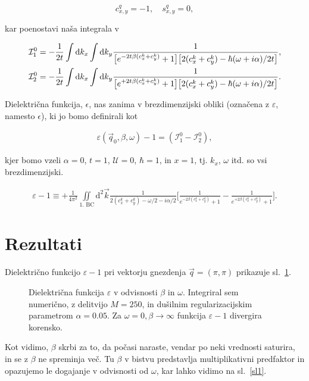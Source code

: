 \documentclass[a4paper, 12pt]{article}
\newcommand{\vq}{
	\ensuremath{\vec{q}}
}
\newcommand{\w}{
	\ensuremath{\omega}
}
\newcommand{\e}{
	\ensuremath{\epsilon}
}
\newcommand{\vk}{
	\ensuremath{\vec{k}}
}
\renewcommand{\ni}{
	\noindent
}
\newcommand{\dd}{
	\ensuremath{\text{d}}
}
\newcommand{\I}{
	\ensuremath{\mathcal{I}}
}
\begin{document}
\begin{equation}
	c_{x,y}^q = -1, \quad s_{x,y}^q = 0,
\end{equation}

\ni kar poenostavi na\v sa integrala v

\begin{align}
	\I_1^0 &= -\frac{1}{2t}\int \dd k_x\int \dd k_y \frac{1}
		{\big[e^{-2t\beta(c_x^k + c_y^k)} + 1\big]\big[2(c_x^k + c_y^k) -
		\hbar(\w + i\alpha)/2t\big]}, \notag \\
	\I_2^0 &= -\frac{1}{2t}\int \dd k_x\int \dd k_y \frac{1}
	{\big[e^{+2t\beta(c_x^k + c_y^k)} + 1\big]\big[2(c_x^k + c_y^k) - \hbar(\w + i\alpha)/2t\big]}.
\end{align}

Dielektri\v cna funkcija, $\e$, nas zanima v brezdimenzijski obliki (ozna\v cena z $\varepsilon$, namesto $\e$), ki jo bomo
definirali kot

\begin{align}
	\varepsilon (\vq_0, \beta, \w) -1 = (\I^0_1 - \I^0_2),
\end{align}

kjer bomo vzeli $\alpha = 0$, $t = 1$, $\mathcal{U} = 0$, $\hbar = 1$, in $x = 1$, tj. $k_x$, $\w$ itd. so vsi brezdimenzijski.

\begin{align}
	\varepsilon -1 \equiv + \frac{1}{4\pi^2}\iint\limits_\text{1. BC} \dd^2 \vk \frac{1}{2(c_x^k + c_y^k) - \w/2 -
	i\alpha/2}
		\bigg[\frac{1}{e^{-2\beta(c_x^k + c_y^k)} + 1} - \frac{1}{e^{+2\beta(c_x^k + c_y^k)} +
1}\bigg].
\end{align}

\section{Rezultati}

Dielektri\v cno funkcijo $\varepsilon - 1$ pri vektorju gnezdenja $\vq = (\pi, \pi)$ prikazuje
sl.~\ref{sl2}.

\begin{figure}[H]
	\centering
	
	\caption{Dielektri\v cna funkcija $\varepsilon$ v odvisnosti $\beta$ in $\omega$.
		Integriral sem numeri\v cno, z delitvijo $M = 250$, in du\v silnim
		regularizacijskim parametrom $\alpha = 0.05$. Za $\w = 0, \beta \to \infty$
		funkcija $\varepsilon -1$ divergira korensko.}
	\label{sl2}
\end{figure}

\ni Kot vidimo, $\beta$ skrbi za to, da po\v casi naraste, vendar po neki vrednosti saturira,
in se z $\beta$ ne spreminja ve\v c. Tu $\beta$ v bistvu predstavlja multiplikativni
predfaktor in opazujemo le dogajanje v odvisnosti od $\w$, kar lahko vidimo na sl.~\ref{sl1}.
\end{document}
